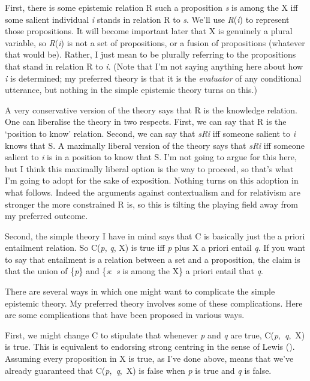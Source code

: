 \documentclass[
  11pt,
  letterpaper,
  DIV=11,
  numbers=noendperiod,
  twoside]{scrartcl}
\begin{document}
First, there is some epistemic relation R such a proposition \emph{s} is
among the X iff some salient individual \emph{i} stands in relation R to
\emph{s}. We'll use \emph{R}(\emph{i}) to represent those propositions.
It will become important later that X is genuinely a plural variable, so
\emph{R}(\emph{i}) is not a set of propositions, or a fusion of
propositions (whatever that would be). Rather, I just mean to be
plurally referring to the propositions that stand in relation R to
\emph{i}. (Note that I'm not saying anything here about how \emph{i} is
determined; my preferred theory is that it is the \emph{evaluator} of
any conditional utterance, but nothing in the simple epistemic theory
turns on this.)

A very conservative version of the theory says that R is the knowledge
relation. One can liberalise the theory in two respects. First, we can
say that R is the `position to know' relation. Second, we can say that
\emph{sRi} iff someone salient to \emph{i} knows that S. A maximally
liberal version of the theory says that \emph{sRi} iff someone salient
to \emph{i} is in a position to know that S. I'm not going to argue for
this here, but I think this maximally liberal option is the way to
proceed, so that's what I'm going to adopt for the sake of exposition.
Nothing turns on this adoption in what follows. Indeed the arguments
against contextualism and for relativism are stronger the more
constrained R is, so this is tilting the playing field away from my
preferred outcome.

Second, the simple theory I have in mind says that C is basically just
the a priori entailment relation. So C(\emph{p}, \emph{q}, X) is true
iff \emph{p} plus X a priori entail \emph{q}. If you want to say that
entailment is a relation between a set and a proposition, the claim is
that the union of \{\emph{p}\} and \{\emph{s}:~\emph{s} is among the X\}
a priori entail that \emph{q}.

There are several ways in which one might want to complicate the simple
epistemic theory. My preferred theory involves some of these
complications. Here are some complications that have been proposed in
various ways.

First, we might change C to stipulate that whenever \emph{p} and
\emph{q} are true, C(\emph{p},~\emph{q},~X) is true. This is equivalent
to endorsing strong centring in the sense of Lewis
(). Assuming every proposition in X is
true, as I've done above, means that we've already guaranteed that
C(\emph{p},~\emph{q},~X) is false when \emph{p} is true and \emph{q} is
false.
\end{document}
